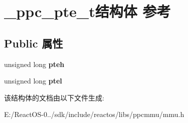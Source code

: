 \hypertarget{struct__ppc__pte__t}{}\section{\+\_\+ppc\+\_\+pte\+\_\+t结构体 参考}
\label{struct__ppc__pte__t}
\subsection*{Public 属性}
\begin{DoxyCompactItemize}
\item 
\mbox{\label{struct__ppc__pte__t_a1078e29825fd01f5bc74abd121a0d2a3}} 
unsigned long {\bfseries pteh}
\item 
\mbox{\label{struct__ppc__pte__t_affb3d550f06c9e6a4e4fe7eb877151cf}} 
unsigned long {\bfseries ptel}
\end{DoxyCompactItemize}


该结构体的文档由以下文件生成\+:\begin{DoxyCompactItemize}
\item 
E\+:/\+React\+O\+S-\/0../sdk/include/reactos/libs/ppcmmu/mmu.\+h\end{DoxyCompactItemize}
